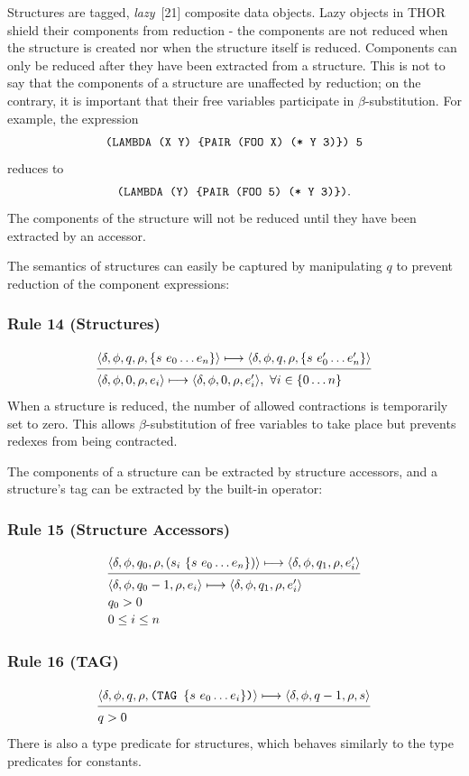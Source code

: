 Structures are tagged, \emph{lazy}~[21] composite data objects. Lazy objects in THOR
shield their components from reduction - the components are not reduced when
the structure is created nor when the structure itself is reduced. Components
can only be reduced after they have been extracted from a structure. This is not
to say that the components of a structure are unaffected by reduction; on the
contrary, it is important that their free variables participate in
\(\beta\)-substitution. For example, the expression
\[
\texttt{(LAMBDA (X Y) \{PAIR (FOO X) (* Y 3)\}) 5}
\]
reduces to
\[
\texttt{(LAMBDA (Y) \{PAIR (FOO 5) (* Y 3)\})}.
\]
The components of the  structure will not be reduced until they have
been extracted by an accessor.

The semantics of structures can easily be captured by manipulating \(q\) to
prevent reduction of the component expressions:

\subsubsection*{Rule 14 (Structures)}
\[
\semanticrule{
\cfg{\delta}{\phi}{q}{\rho}{\{s\ e_0\ldots e_n\}}\redsto
\cfg{\delta}{\phi}{q}{\rho}{\{s\ e'_0\ldots e'_n\}}
}{
\cfg{\delta}{\phi}{0}{\rho}{e_i}\redsto
\cfg{\delta}{\phi}{0}{\rho}{e'_i},\ \forall i\in\{0\ldots n\}
}
\]
When a structure is reduced, the number of allowed contractions is temporarily
set to zero. This allows \(\beta\)-substitution of free variables to take place
but prevents redexes from being contracted.

The components of a structure can be extracted by structure accessors, and a
structure's tag can be extracted by the built-in  operator:

\subsubsection*{Rule 15 (Structure Accessors)}
\[
\semanticrule{
\cfg{\delta}{\phi}{q_0}{\rho}{(s_i\ \{s\ e_0\ldots e_n\})}\redsto
\cfg{\delta}{\phi}{q_1}{\rho}{e'_i}
}{
\cfg{\delta}{\phi}{q_0-1}{\rho}{e_i}\redsto
\cfg{\delta}{\phi}{q_1}{\rho}{e'_i}\\
q_0>0\\ 0\le i\le n
}
\]

\subsubsection*{Rule 16 (TAG)}
\[
\semanticrule{
\cfg{\delta}{\phi}{q}{\rho}{\THOR{(TAG }\{s\ e_0\ldots e_i\}\THOR{)}}\redsto
      \cfg{\delta}{\phi}{q-1}{\rho}{s}
}{
q>0
}
\]
There is also a type predicate for structures, which behaves similarly to the
type predicates for constants.

